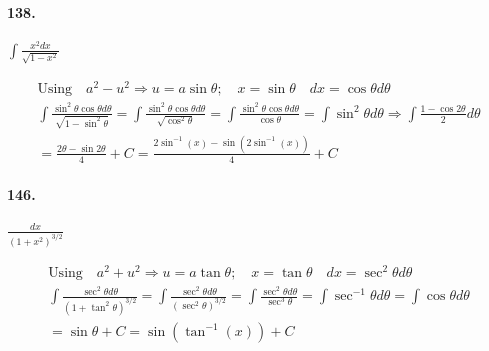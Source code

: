     \paragraph*{138.}
    $\int \frac{x^{2}dx}{\sqrt{1-x^2}}$
    \\
    \begin{mdframed}
        \begin{equation*}
            \begin{gathered}
                \text{Using} \quad a^2 - u^2 \Rightarrow    
                u = a\sin\theta; \quad x = \sin\theta 
                \quad dx = \cos\theta d \theta                  \\
                \int \frac{\sin^2\theta\cos\theta d \theta}
                {\sqrt{1 - \sin^2\theta}}
                = \int \frac{\sin^2\theta\cos\theta d \theta}
                {\sqrt{\cos^2\theta}} 
                = \int \frac{\sin^2\theta\cos\theta d \theta}
                {\cos\theta}
                = \int \sin^2\theta d \theta \Rightarrow
                \int \frac{1-\cos 2\theta}{2}d\theta            \\
                = \frac{2\theta - \sin 2\theta}{4} + C 
                = \boxed{\frac{2\sin^{-1}(x) - \sin(2\sin^{-1}(x))}{4} + C}
            \end{gathered}
        \end{equation*}
    \end{mdframed}

    \paragraph*{146.}
    $\frac{dx}{(1+x^2)^{3/2}}$
    \\
    \begin{mdframed}
        \begin{equation*}
            \begin{gathered}
                \text{Using} \quad a^2 + u^2 \Rightarrow
                u = a\tan\theta; \quad x = \tan\theta \quad dx 
                = \sec^2\theta d \theta                     \\
                \int \frac{\sec^2\theta d \theta}
                {(1+\tan^2\theta)^{3/2}}
                = \int \frac{\sec^2\theta d \theta} 
                {(\sec^2\theta)^{3/2}}
                = \int \frac{\sec^2\theta d \theta}
                {\sec^3\theta}
                = \int \sec^{-1}\theta d \theta
                = \int \cos\theta d \theta                   \\
                = \sin\theta + C = \boxed{\sin(\tan^{-1}(x)) + C}      
            \end{gathered}
        \end{equation*}
    \end{mdframed}
